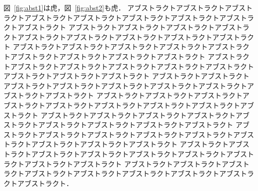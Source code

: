\documentclass[a4paper,fleqn,dvipdfmx,11pt]{jreport}
\begin{document}
図~\ref{fig:abst1}は虎，図~\ref{fig:abst2}も虎．
アブストラクトアブストラクトアブストラクトアブストラクトアブストラクトアブストラクトアブストラクトアブストラクトアブストラクト
アブストラクトアブストラクトアブストラクトアブストラクトアブストラクトアブストラクトアブストラクトアブストラクトアブストラクト
アブストラクトアブストラクトアブストラクトアブストラクトアブストラクトアブストラクトアブストラクトアブストラクトアブストラクト
アブストラクトアブストラクトアブストラクトアブストラクトアブストラクトアブストラクトアブストラクトアブストラクトアブストラクト
アブストラクトアブストラクトアブストラクトアブストラクトアブストラクトアブストラクトアブストラクトアブストラクトアブストラクト
アブストラクトアブストラクトアブストラクトアブストラクトアブストラクトアブストラクトアブストラクトアブストラクトアブストラクト
アブストラクトアブストラクトアブストラクトアブストラクトアブストラクトアブストラクトアブストラクトアブストラクトアブストラクト
アブストラクトアブストラクトアブストラクトアブストラクトアブストラクトアブストラクトアブストラクトアブストラクトアブストラクト
アブストラクトアブストラクトアブストラクトアブストラクトアブストラクトアブストラクトアブストラクトアブストラクトアブストラクト
アブストラクトアブストラクトアブストラクトアブストラクトアブストラクトアブストラクトアブストラクトアブストラクトアブストラクト．
\end{document}
